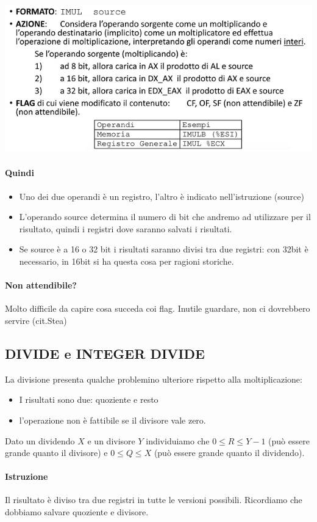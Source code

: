 \documentclass[11pt]{report}
\begin{document}
\begin{center}
\includegraphics{img/20.PNG}
\end{center}
\paragraph{Quindi}
\begin{itemize}
\item Uno dei due operandi è un registro, l'altro è indicato nell'istruzione (source)
\item L'operando source determina il numero di bit che andremo ad utilizzare per il risultato, quindi i registri dove saranno salvati i risultati.
\item Se source è a 16 o 32 bit i risultati saranno divisi tra due registri: con 32bit è necessario, in 16bit si ha questa cosa per ragioni storiche.
\end{itemize}
\paragraph{Non attendibile?} Molto difficile da capire cosa succeda coi flag. Inutile guardare, non ci dovrebbero servire (cit.Stea)
\subsection{DIVIDE e INTEGER DIVIDE}
La divisione presenta qualche problemino ulteriore rispetto alla moltiplicazione:
\begin{itemize}
\item I risultati sono due: quoziente e resto
\item l'operazione non è fattibile se il divisore vale zero.
\end{itemize}
Dato un dividendo $X$ e un divisore $Y$ individuiamo che $0\leq R \leq Y-1$ (può essere grande quanto il divisore) e $0 \leq Q \leq X$ (può essere grande quanto il dividendo).
\paragraph{Istruzione} Il risultato è diviso tra due registri in tutte le versioni possibili. Ricordiamo che dobbiamo salvare quoziente e divisore.
\end{document}
